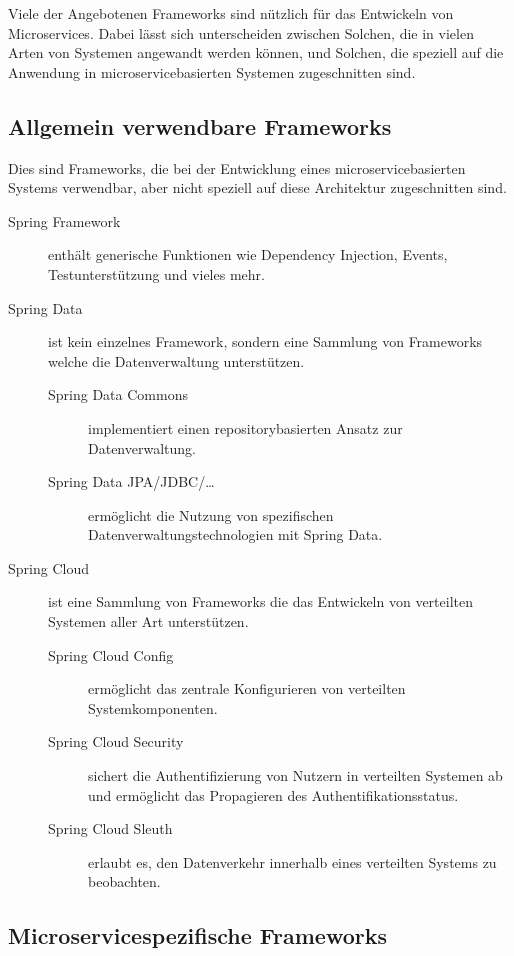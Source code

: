 \documentclass{article}
\begin{document}
Viele der Angebotenen Frameworks sind nützlich für das Entwickeln von Microservices.
Dabei lässt sich unterscheiden zwischen Solchen, die in vielen Arten von Systemen angewandt werden können, und Solchen, die speziell auf die Anwendung in microservicebasierten Systemen zugeschnitten sind.

\subsection{Allgemein verwendbare Frameworks}

Dies sind Frameworks, die bei der Entwicklung eines microservicebasierten Systems verwendbar, aber nicht speziell auf diese Architektur zugeschnitten sind.

\begin{description}
    \item[Spring Framework] enthält generische Funktionen wie Dependency Injection, Events, Testunterstützung und vieles mehr.
    \item[Spring Data] ist kein einzelnes Framework, sondern eine Sammlung von Frameworks welche die Datenverwaltung unterstützen.
    \begin{description}
        \item[Spring Data Commons] implementiert einen repositorybasierten Ansatz zur Datenverwaltung.
        \item[Spring Data JPA/JDBC/\ldots] ermöglicht die Nutzung von spezifischen Datenverwaltungstechnologien mit Spring Data.
    \end{description}

    \item[Spring Cloud] ist eine Sammlung von Frameworks die das Entwickeln von verteilten Systemen aller Art unterstützen.
    \begin{description}
        \item[Spring Cloud Config] ermöglicht das zentrale Konfigurieren von verteilten Systemkomponenten.
        \item[Spring Cloud Security] sichert die Authentifizierung von Nutzern in verteilten Systemen ab und ermöglicht das Propagieren des Authentifikationsstatus.
        \item[Spring Cloud Sleuth] erlaubt es, den Datenverkehr innerhalb eines verteilten Systems zu beobachten.
    \end{description}
\end{description}

\subsection{Microservicespezifische Frameworks}
\end{document}
